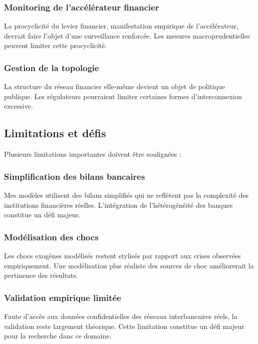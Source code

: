 \documentclass[12pt,a4paper,twoside]{article}
\begin{document}
\subsubsection{Monitoring de l'accélérateur financier}

La procyclicité du levier financier, manifestation empirique de l'accélérateur, devrait faire l'objet d'une surveillance renforcée. Les mesures macroprudentielles peuvent limiter cette procyclicité.

\subsubsection{Gestion de la topologie}

La structure du réseau financier elle-même devient un objet de politique publique. Les régulateurs pourraient limiter certaines formes d'interconnexion excessive.

\subsection{Limitations et défis}

Plusieurs limitations importantes doivent être soulignées :

\subsubsection{Simplification des bilans bancaires}

Mes modèles utilisent des bilans simplifiés qui ne reflètent pas la complexité des institutions financières réelles. L'intégration de l'hétérogénéité des banques constitue un défi majeur.

\subsubsection{Modélisation des chocs}

Les chocs exogènes modélisés restent stylisés par rapport aux crises observées empiriquement. Une modélisation plus réaliste des sources de choc améliorerait la pertinence des résultats.

\subsubsection{Validation empirique limitée}

Faute d'accès aux données confidentielles des réseaux interbancaires réels, la validation reste largement théorique. Cette limitation constitue un défi majeur pour la recherche dans ce domaine.
\end{document}
